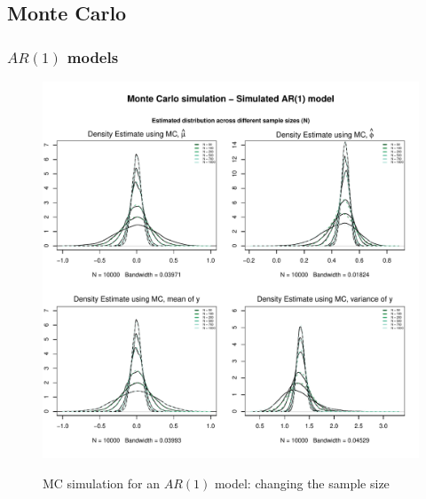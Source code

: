 \documentclass{article}
\begin{document}
\subsection{Monte Carlo}
\subsubsection{$AR(1)$ models}
\begin{figure}[hbt!]
\includegraphics[width=\textwidth]{plots/MC_AR1_densities_diff_smpl}
\label{fig:MC_AR1_densities_diff_smpl}
\caption{MC simulation for an $AR(1)$ model: changing the sample size}
\centering
\end{figure}
\end{document}
